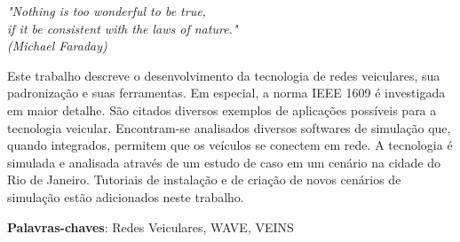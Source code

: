 \documentclass[
12pt,				%
openright,			%
oneside,			%
a4paper,			%
brazil,				%
]{abntex2}
\begin{document}
	\begin{dedicatoria}
		\vspace*{\fill}
		\centering
		\noindent
		\textit{%
			} \vspace*{\fill}
	\end{dedicatoria}
	
	\begin{agradecimentos}
		
		
		
	\end{agradecimentos} 
	
	
	\newpage
	\begin{epigrafe}
		\vspace*{\fill}
		\begin{flushright}
			\textit{"Nothing is too wonderful to be true,\\
				 if it be consistent with the laws of nature."\\
				(Michael Faraday)}
		\end{flushright}
	\end{epigrafe}
	
\setlength{\absparsep}{18pt} %
\begin{resumo}
	
	\par Este trabalho descreve o desenvolvimento da tecnologia de redes veiculares, sua padronização e suas ferramentas. Em especial, a norma IEEE 1609 é investigada em maior detalhe. São citados diversos exemplos de aplicações possíveis para a tecnologia veicular. Encontram-se analisados diversos softwares de simulação que, quando integrados, permitem que os veículos se conectem em rede. A tecnologia é simulada e analisada através de um estudo de caso em um cenário na cidade do Rio de Janeiro. Tutoriais de instalação e de criação de novos cenários de simulação estão adicionados neste trabalho.
			
	\vspace{\onelineskip}
			
	\textbf{Palavras-chaves}: Redes Veiculares, WAVE, VEINS
\end{resumo}
	
\end{document}
